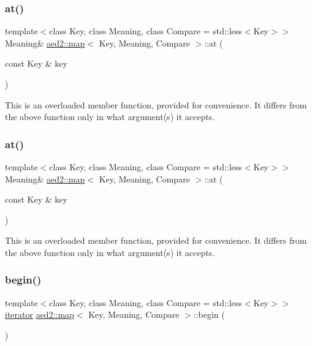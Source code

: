 \subsubsection{\texorpdfstring{at()}{at()}\hspace{0.1cm}{\footnotesize\ttfamily [3/4]}}
{\footnotesize\ttfamily template$<$class Key, class Meaning, class Compare = std\+::less$<$\+Key$>$$>$ \\
Meaning\& \hyperlink{classaed2_1_1map}{aed2\+::map}$<$ Key, Meaning, Compare $>$\+::at (\begin{DoxyParamCaption}\item[{const Key \&}]{key }\end{DoxyParamCaption})\hspace{0.3cm}{\ttfamily [inline]}}

This is an overloaded member function, provided for convenience. It differs from the above function only in what argument(s) it accepts. \mbox{\label{classaed2_1_1map_a6b21c09f59a83b6ee45432dcfa61f4a1}} 
\subsubsection{\texorpdfstring{at()}{at()}\hspace{0.1cm}{\footnotesize\ttfamily [4/4]}}
{\footnotesize\ttfamily template$<$class Key, class Meaning, class Compare = std\+::less$<$\+Key$>$$>$ \\
Meaning\& \hyperlink{classaed2_1_1map}{aed2\+::map}$<$ Key, Meaning, Compare $>$\+::at (\begin{DoxyParamCaption}\item[{const Key \&}]{key }\end{DoxyParamCaption})\hspace{0.3cm}{\ttfamily [inline]}}

This is an overloaded member function, provided for convenience. It differs from the above function only in what argument(s) it accepts. \mbox{\label{classaed2_1_1map_a58a95705d54b3dda7f775ce5a22225cb}} 
\subsubsection{\texorpdfstring{begin()}{begin()}\hspace{0.1cm}{\footnotesize\ttfamily [1/2]}}
{\footnotesize\ttfamily template$<$class Key, class Meaning, class Compare = std\+::less$<$\+Key$>$$>$ \\
\hyperlink{classaed2_1_1map_1_1iterator}{iterator} \hyperlink{classaed2_1_1map}{aed2\+::map}$<$ Key, Meaning, Compare $>$\+::begin (\begin{DoxyParamCaption}{ }\end{DoxyParamCaption})\hspace{0.3cm}{\ttfamily [inline]}}




